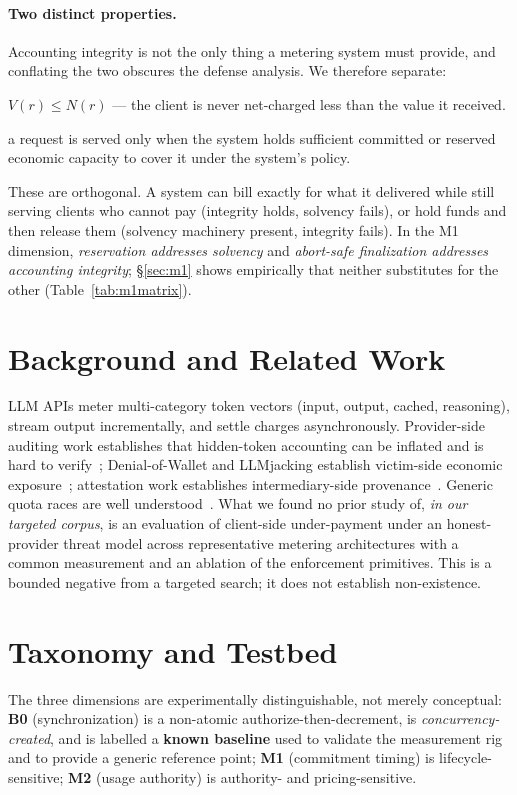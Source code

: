 \documentclass[11pt]{article}
\begin{document}
\paragraph{Two distinct properties.} Accounting integrity is not the only thing a
metering system must provide, and conflating the two obscures the defense analysis. We
therefore separate:
\begin{description}\itemsep1pt
\item[Accounting integrity] $V(r)\le N(r)$ --- the client is never net-charged less than
the value it received.
\item[Solvency] a request is served only when the system holds sufficient committed or
reserved economic capacity to cover it under the system's policy.
\end{description}
These are orthogonal. A system can bill exactly for what it delivered while still serving
clients who cannot pay (integrity holds, solvency fails), or hold funds and then release
them (solvency machinery present, integrity fails). In the M1 dimension, \emph{reservation
addresses solvency} and \emph{abort-safe finalization addresses accounting integrity};
\S\ref{sec:m1} shows empirically that neither substitutes for the other
(Table~\ref{tab:m1matrix}).

\section{Background and Related Work}
LLM APIs meter multi-category token vectors (input, output, cached, reasoning), stream
output incrementally, and settle charges asynchronously. Provider-side auditing work
establishes that hidden-token accounting can be inflated and is hard to
verify~\cite{coin,invisible,tokeninflation}; Denial-of-Wallet and LLMjacking establish
victim-side economic exposure~\cite{dow,llmjacking}; attestation work establishes
intermediary-side provenance~\cite{aex,gwprov}. Generic quota races are well
understood~\cite{kettle}. What we found no prior study of, \emph{in our targeted
corpus}, is an evaluation of client-side under-payment under an honest-provider threat
model across representative metering architectures with a common measurement and an
ablation of the enforcement primitives. This is a bounded negative from a targeted
search; it does not establish non-existence.



\section{Taxonomy and Testbed}
\label{sec:taxonomy}
The three dimensions are experimentally distinguishable, not merely conceptual:
\textbf{B0} (synchronization) is a non-atomic authorize-then-decrement, is
\emph{concurrency-created}, and is labelled a \textbf{known baseline} used to validate
the measurement rig and to provide a generic reference point; \textbf{M1} (commitment
timing) is lifecycle-sensitive; \textbf{M2} (usage authority) is authority- and
pricing-sensitive.
\end{document}
